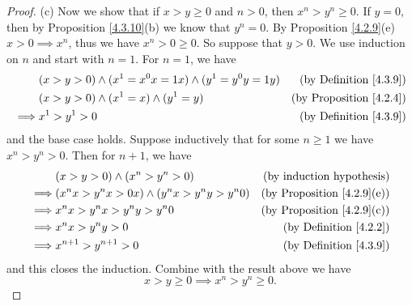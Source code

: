 \begin{proof}{(c)}
    Now we show that if \(x > y \geq 0\) and \(n > 0\), then \(x^n > y^n \geq 0\).
    If \(y = 0\), then by Proposition \ref{4.3.10}(b) we know that \(y^n = 0\).
    By Proposition \ref{4.2.9}(e) \(x > 0 \implies x^n\), thus we have \(x^n > 0 \geq 0\).
    So suppose that \(y > 0\).
    We use induction on \(n\) and start with \(n = 1\).
    For \(n = 1\), we have
    \begin{align*}
                 & (x > y > 0) \land (x^1 = x^0 x = 1x) \land (y^1 = y^0 y = 1y) & \text{(by Definition \ref{4.3.9})}  \\
                 & (x > y > 0) \land (x^1 = x) \land (y^1 = y)                   & \text{(by Proposition \ref{4.2.4})} \\
        \implies & x^1 > y^1 > 0                                                 & \text{(by Definition \ref{4.3.9})}
    \end{align*}
    and the base case holds.
    Suppose inductively that for some \(n \geq 1\) we have \(x^n > y^n > 0\).
    Then for \(n + 1\), we have
    \begin{align*}
                 & (x > y > 0) \land (x^n > y^n > 0)                  & \text{(by induction hypothesis)}       \\
        \implies & (x^n x > y^n x > 0x) \land (y^n x > y^n y > y^n 0) & \text{(by Proposition \ref{4.2.9}(e))} \\
        \implies & x^n x > y^n x > y^n y > y^n 0                      & \text{(by Proposition \ref{4.2.9}(c))} \\
        \implies & x^n x > y^n y > 0                                  & \text{(by Definition \ref{4.2.2})}     \\
        \implies & x^{n + 1} > y^{n + 1} > 0                          & \text{(by Definition \ref{4.3.9})}
    \end{align*}
    and this closes the induction.
    Combine with the result above we have
    \[
        x > y \geq 0 \implies x^n > y^n \geq 0.
    \]
\end{proof}

